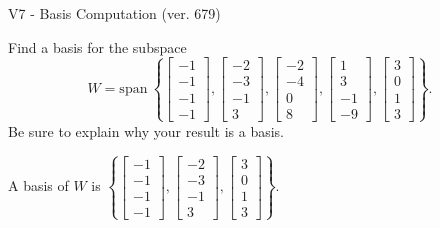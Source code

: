 \begin{exercise}
  \begin{exerciseTitle}V7 - Basis Computation (ver. 679)\end{exerciseTitle}
  \begin{exerciseStatement}
    Find a basis for the subspace 
\[W=\mathrm{span}\ \left\{\left[\begin{array}{r}
-1 \\
-1 \\
-1 \\
-1
\end{array}\right] , \left[\begin{array}{r}
-2 \\
-3 \\
-1 \\
3
\end{array}\right] , \left[\begin{array}{r}
-2 \\
-4 \\
0 \\
8
\end{array}\right] , \left[\begin{array}{r}
1 \\
3 \\
-1 \\
-9
\end{array}\right] , \left[\begin{array}{r}
3 \\
0 \\
1 \\
3
\end{array}\right]\right\}.\]
 Be sure to explain why your result is a basis.


  \end{exerciseStatement}
  \begin{exerciseAnswer}
   A basis of \(W\) is  \(\left\{\left[\begin{array}{r}
-1 \\
-1 \\
-1 \\
-1
\end{array}\right] , \left[\begin{array}{r}
-2 \\
-3 \\
-1 \\
3
\end{array}\right] , \left[\begin{array}{r}
3 \\
0 \\
1 \\
3
\end{array}\right]\right\}\).
  


  \end{exerciseAnswer}
\end{exercise}
